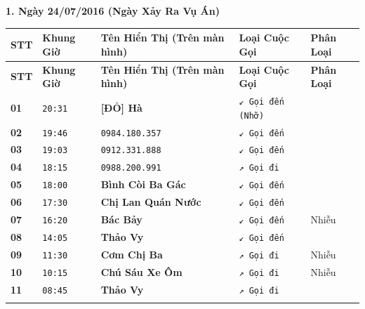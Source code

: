 \documentclass[12pt,a4paper]{article}
\begin{document}
\vspace{0.3cm}\noindent\textbf{\large 1. Ngày 24/07/2016 (Ngày Xảy Ra Vụ Án)}\\[0.15cm]



\vspace{0.2cm}
\begingroup
\small
\begin{xltabular}{\textwidth}{>{\hsize}X >{\hsize}X >{\hsize}X >{\hsize}X >{\hsize}X}
\toprule
\textbf{STT} & \textbf{Khung Giờ} & \textbf{Tên Hiển Thị (Trên màn hình)} & \textbf{Loại Cuộc Gọi} & \textbf{Phân Loại} \\
\midrule
\endfirsthead
\toprule
\textbf{STT} & \textbf{Khung Giờ} & \textbf{Tên Hiển Thị (Trên màn hình)} & \textbf{Loại Cuộc Gọi} & \textbf{Phân Loại} \\
\midrule
\endhead
\bottomrule
\endfoot
\textbf{01} & \texttt{20:31} &  \textbf{[ĐỎ] Hà} & \texttt{↙ Gọi đến (Nhỡ)} &  \\ \addlinespace[4pt]
\textbf{02} & \texttt{19:46} & \texttt{0984.180.357} & \texttt{↙ Gọi đến} &  \\ \addlinespace[4pt]
\textbf{03} & \texttt{19:03} & \texttt{0912.331.888} & \texttt{↙ Gọi đến} &  \\ \addlinespace[4pt]
\textbf{04} & \texttt{18:15} & \texttt{0988.200.991} & \texttt{↗ Gọi đi} &  \\ \addlinespace[4pt]
\textbf{05} & \texttt{18:00} & \textbf{Bình Còi Ba Gác} & \texttt{↙ Gọi đến} &  \\ \addlinespace[4pt]
\textbf{06} & \texttt{17:30} & \textbf{Chị Lan Quán Nước} & \texttt{↙ Gọi đến} &  \\ \addlinespace[4pt]
\textbf{07} & \texttt{16:20} & \textbf{Bác Bảy} & \texttt{↙ Gọi đến} & Nhiễu \\ \addlinespace[4pt]
\textbf{08} & \texttt{14:05} & \textbf{Thảo Vy} & \texttt{↙ Gọi đến} &  \\ \addlinespace[4pt]
\textbf{09} & \texttt{11:30} & \textbf{Cơm Chị Ba} & \texttt{↗ Gọi đi} & Nhiễu \\ \addlinespace[4pt]
\textbf{10} & \texttt{10:15} & \textbf{Chú Sáu Xe Ôm} & \texttt{↗ Gọi đi} & Nhiễu \\ \addlinespace[4pt]
\textbf{11} & \texttt{08:45} & \textbf{Thảo Vy} & \texttt{↗ Gọi đi} &  \\ \addlinespace[4pt]
\end{xltabular}
\endgroup

\vspace{0.2cm}
\end{document}
